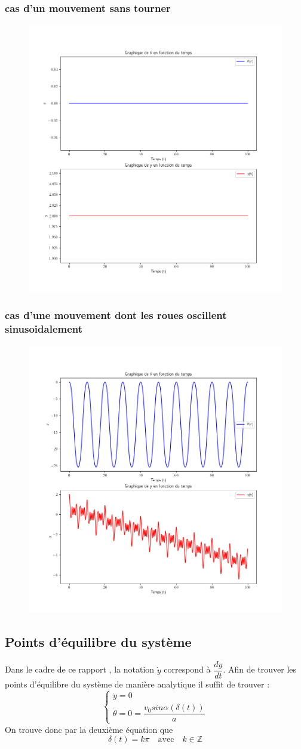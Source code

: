 \documentclass[11pt,a4paper]{article}
\begin{document}
\subsubsection{cas d'un mouvement sans tourner}
\begin{figure}[!h]
    \centering
    \includegraphics[width=0.5\linewidth]{Q3_flat.png}
\end{figure}
\newpage
\subsubsection{cas d'une mouvement dont les roues oscillent sinusoidalement}
\begin{figure}[!h]
    \centering
    \includegraphics[width=0.5\linewidth]{Q3.png}
\end{figure}
\subsection{Points d'équilibre du système}
Dans le cadre de ce rapport , la notation $\dot y$ correspond à $\dfrac{d y}{dt}$.
Afin de trouver les points d'équilibre du système de manière analytique il suffit de trouver :
\begin{equation}
    \begin{cases}
      \dot y=0\\
      \dot \theta=0= \dfrac{v_0 sin \alpha(\delta (t) )}{a}
    \end{cases}
\end{equation}
On trouve donc par la deuxième équation que 
$$\delta(t) = k\pi \quad \text{avec} \quad k \in \mathbb{Z}$$
\end{document}
